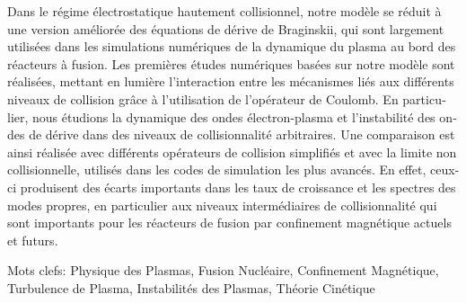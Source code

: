 \begin{otherlanguage}{portuguese}
%
Dans le régime électrostatique hautement collisionnel, notre modèle se réduit à une version améliorée des équations de dérive de Braginskii, qui sont largement utilisées dans les simulations numériques de la dynamique du plasma au bord des réacteurs à fusion.
%
Les premières études numériques basées sur notre modèle sont réalisées, mettant en lumière l’interaction entre les mécanismes liés aux différents niveaux de collision grâce à l'utilisation de l'opérateur de Coulomb.
%
En particulier, nous étudions la dynamique des ondes électron-plasma et l’instabilité des ondes de dérive dans des niveaux de collisionnalité arbitraires.
%
Une comparaison est ainsi réalisée avec différents opérateurs de collision simplifiés et avec la limite non
collisionnelle, utilisés dans les codes de simulation les plus avancés.
%
En effet, ceux-ci produisent des écarts importants dans les taux de croissance et les spectres des modes propres, en particulier aux niveaux intermédiaires de collisionnalité qui sont importants pour les réacteurs
de fusion par confinement magnétique actuels et futurs.


\vskip0.5cm
Mots clefs: Physique des Plasmas, Fusion Nucléaire, Confinement Magnétique, Turbulence de Plasma, Instabilités des Plasmas, Théorie Cinétique

\end{otherlanguage}

